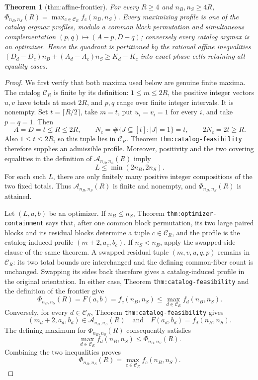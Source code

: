 \documentclass{article}
\newtheorem{theorem}{Theorem}
\begin{document}
\begin{theorem}[thm:affine-frontier]\label{thm:affine-frontier}
For every \(R\ge4\) and \(n_B,n_S\ge4R\), \(\Phi_{n_B,n_S}(R)=\max_{c\in\mathcal C_R}f_c(n_B,n_S)\). Every maximizing profile is one of the catalog argmax profiles, modulo a common block permutation and simultaneous complementation \((p,q)\mapsto(A-p,D-q)\); conversely every catalog argmax is an optimizer. Hence the quadrant is partitioned by the rational affine inequalities \((D_d-D_c)n_B+(A_d-A_c)n_S\ge K_d-K_c\) into exact phase cells retaining all equality cases.
\end{theorem}
\begin{proof}
We first verify that both maxima used below are genuine finite maxima. The catalog \(\mathcal C_R\) is finite by its definition: \(1\le m\le2R\), the positive integer vectors \(u,v\) have totals at most \(2R\), and \(p,q\) range over finite integer intervals. It is nonempty. Set \(t=\lceil R/2\rceil\), take \(m=t\), put \(u_i=v_i=1\) for every \(i\), and take \(p=q=1\). Then
\[
A=D=t\le R\le2R,
\qquad
N_c=\#\{J\subseteq[t]:|J|=1\}=t,
\qquad
2N_c=2t\ge R.
\]
Also \(1\le t\le2R\), so this tuple lies in \(\mathcal C_R\). Theorem \texttt{thm:catalog-feasibility} therefore supplies an admissible profile. Moreover, positivity and the two covering equalities in the definition of \(\mathcal A_{n_B,n_S}(R)\) imply
\[
L\le \min(2n_B,2n_S).
\]
For each such \(L\), there are only finitely many positive integer compositions of the two fixed totals. Thus \(\mathcal A_{n_B,n_S}(R)\) is finite and nonempty, and \(\Phi_{n_B,n_S}(R)\) is attained.

Let \((L,a,b)\) be an optimizer. If \(n_B\le n_S\), Theorem \texttt{thm:optimizer-containment} says that, after one common block permutation, its two large paired blocks and its residual blocks determine a tuple \(c\in\mathcal C_R\), and the profile is the catalog-induced profile \((m+2,a_c,b_c)\). If \(n_S<n_B\), apply the swapped-side clause of the same theorem. A swapped residual tuple \((m,v,u,q,p)\) remains in \(\mathcal C_R\): its two total bounds are interchanged and the defining common-fiber count is unchanged. Swapping its sides back therefore gives a catalog-induced profile in the original orientation. In either case, Theorem \texttt{thm:catalog-feasibility} and the definition of the frontier give
\[
\Phi_{n_B,n_S}(R)
=F(a,b)
=f_c(n_B,n_S)
\le \max_{d\in\mathcal C_R}f_d(n_B,n_S).
\]
Conversely, for every \(d\in\mathcal C_R\), Theorem \texttt{thm:catalog-feasibility} gives
\[
(m_d+2,a_d,b_d)\in\mathcal A_{n_B,n_S}(R)
\quad\text{and}\quad
F(a_d,b_d)=f_d(n_B,n_S).
\]
The defining maximum for \(\Phi_{n_B,n_S}(R)\) consequently satisfies
\[
\max_{d\in\mathcal C_R}f_d(n_B,n_S)
\le \Phi_{n_B,n_S}(R).
\]
Combining the two inequalities proves
\[
\Phi_{n_B,n_S}(R)=\max_{c\in\mathcal C_R}f_c(n_B,n_S).
\]


\end{proof}
\end{document}
